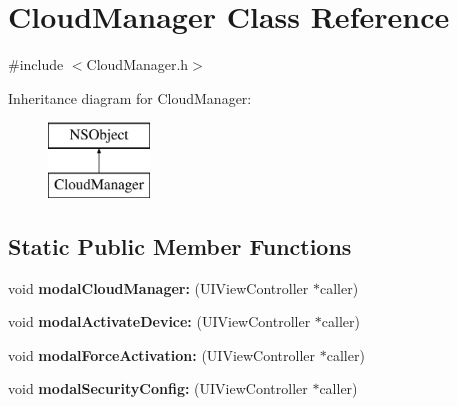 \hypertarget{interface_cloud_manager}{
\section{\-Cloud\-Manager \-Class \-Reference}
\label{interface_cloud_manager}
}


{\ttfamily \#include $<$\-Cloud\-Manager.\-h$>$}

\-Inheritance diagram for \-Cloud\-Manager\-:\begin{figure}[H]
\begin{center}
\leavevmode
\includegraphics[height=2.000000cm]{interface_cloud_manager}
\end{center}
\end{figure}
\subsection*{\-Static \-Public \-Member \-Functions}
\begin{DoxyCompactItemize}
\item 
\hypertarget{interface_cloud_manager_a6ae267e8d2feb7cf7319b0b780cd85c8}{
void {\bfseries modal\-Cloud\-Manager\-:} (\-U\-I\-View\-Controller $\ast$caller)}
\label{interface_cloud_manager_a6ae267e8d2feb7cf7319b0b780cd85c8}

\item 
\hypertarget{interface_cloud_manager_aa8ae774ab9ecc8f7fd3fdf21449f37b6}{
void {\bfseries modal\-Activate\-Device\-:} (\-U\-I\-View\-Controller $\ast$caller)}
\label{interface_cloud_manager_aa8ae774ab9ecc8f7fd3fdf21449f37b6}

\item 
\hypertarget{interface_cloud_manager_ac5541c0c77016bb5f3d6b9667d4e1045}{
void {\bfseries modal\-Force\-Activation\-:} (\-U\-I\-View\-Controller $\ast$caller)}
\label{interface_cloud_manager_ac5541c0c77016bb5f3d6b9667d4e1045}

\item 
\hypertarget{interface_cloud_manager_ae4bf44780cd8facd28c00a7bbeec2bf1}{
void {\bfseries modal\-Security\-Config\-:} (\-U\-I\-View\-Controller $\ast$caller)}
\label{interface_cloud_manager_ae4bf44780cd8facd28c00a7bbeec2bf1}

\end{DoxyCompactItemize}


